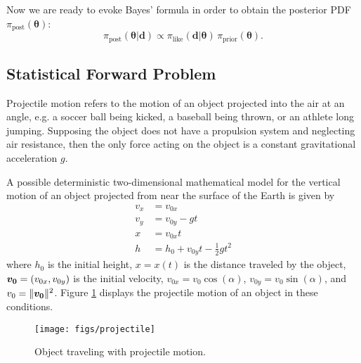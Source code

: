Now we are ready to evoke Bayes' formula in order to obtain the posterior PDF $\pi_{\text{post}}(\boldsymbol{\theta})$:
\begin{equation}\label{eq-Bayes-g}
\pi_{\text{post}}(\boldsymbol{\theta}|\mathbf{d})\varpropto  \pi_{\text{like}}(\mathbf{d}|\boldsymbol{\theta}) \, \pi_{\text{prior}}(\boldsymbol{\theta}).
\end{equation}


\subsection{Statistical Forward Problem}


Projectile motion refers to the motion of an object projected into the air at an angle, e.g. a soccer ball being kicked, a baseball being thrown, or an athlete long jumping. Supposing the object does not have a propulsion system and neglecting air resistance, then the only force acting on the object is a constant gravitational acceleration $g$.


A possible deterministic two-dimensional mathematical model for the vertical motion of an object projected from near the surface of the Earth is given by
\begin{align}\label{eq:fwd01}
v_x &= v_{0x} \\ %
v_y &= v_{0y} - gt \\ %
  x &= v_{0x}t \\ %
  h &= h_0 + v_{0y}t - \frac{1}{2} g t^2  %
\end{align}
where
$h_0$ is the initial height, $x=x(t)$ is the distance traveled by the object, $\mbox{\boldmath$ v_0 $}=(v_{0x},v_{0y})$ is the initial velocity,
$v_{0x} = v_{0} \cos(\alpha)$, $v_{0y} = v_{0} \sin(\alpha)$, and $v_0=\|\mbox{\boldmath$ v_0 $}\|^2$.
%
Figure \ref{fig:projectile} displays the projectile motion of an object in these conditions.
\begin{figure}[!ht]
\centering
\texttt{[image: figs/projectile]}
\vspace*{-8pt}
\caption{Object traveling with projectile motion. }
\label{fig:projectile}
\end{figure}




